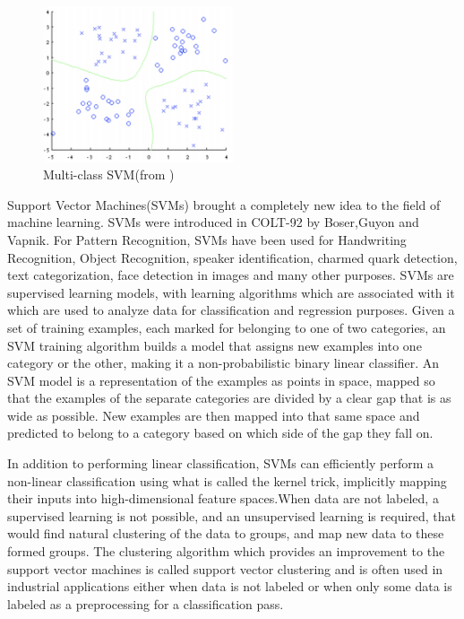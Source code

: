 \begin{figure}[b]
	\begin{center}
		\includegraphics[width=0.5\textwidth]{Figures/Figure10}
	\end{center}
	\caption{Multi-class SVM(from \cite{libsvm})}
	\label{fig:Figure10}
\end{figure}

Support Vector Machines(SVMs)\cite{vapnik} brought a completely new idea to the field of machine learning. SVMs were introduced in COLT-92 by Boser,Guyon and Vapnik. For Pattern Recognition, SVMs have been used for Handwriting Recognition, Object Recognition, speaker identification, charmed quark detection, text categorization, face detection in images and many other purposes. SVMs are supervised learning models, with learning algorithms which are associated with it which are used to analyze data for classification and regression purposes. Given a set of training examples, each marked for belonging to one of two categories, an SVM training algorithm builds a model that assigns new examples into one category or the other, making it a non-probabilistic binary linear classifier. An SVM model is a representation of the examples as points in space, mapped so that the examples of the separate categories are divided by a clear gap that is as wide as possible. New examples are then mapped into that same space and predicted to belong to a category based on which side of the gap they fall on.

In addition to performing linear classification, SVMs can efficiently perform a non-linear classification using what is called the kernel trick, implicitly mapping their inputs into high-dimensional feature spaces.When data are not labeled, a supervised learning is not possible, and an unsupervised learning is required, that would find natural clustering of the data to groups, and map new data to these formed groups. The clustering algorithm which provides an improvement to the support vector machines is called support vector clustering and is often used in industrial applications either when data is not labeled or when only some data is labeled as a preprocessing for a classification pass.

